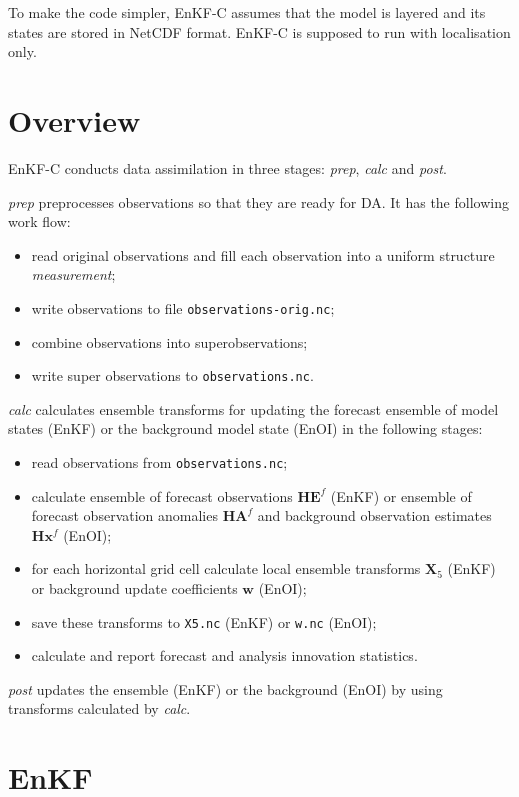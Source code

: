 \documentclass[11pt]{report}
\newcommand{\mb} {\mathbf}
\begin{document}
To make the code simpler, EnKF-C assumes that the model is layered and its states are stored in NetCDF format.
EnKF-C is supposed to run with localisation only.

\chapter{Overview}

EnKF-C conducts data assimilation in three stages: \emph{prep}, \emph{calc} and \emph{post}.

\emph{prep} preprocesses observations so that they are ready for DA.
It has the following work flow:
\begin{itemize}
\item read original observations and fill each observation into a uniform structure \emph{measurement};
\item write observations to file \verb|observations-orig.nc|;
\item combine observations into superobservations;
\item write super observations to \verb|observations.nc|.
\end{itemize}

\emph{calc} calculates ensemble transforms for updating the forecast ensemble of model states (EnKF) or the background model state (EnOI) in the following stages:
\begin{itemize}
\item read observations from \verb|observations.nc|;
\item calculate ensemble of forecast observations $\mb H \mb E^f$ (EnKF) or ensemble of forecast observation anomalies $\mb H \mb A^f$ and background observation estimates $\mb H \mb x^f$ (EnOI);
\item for each horizontal grid cell calculate local ensemble transforms $\mb X_5$ (EnKF) or background update coefficients $\mb w$ (EnOI);
\item save these transforms to \verb|X5.nc| (EnKF) or \verb|w.nc| (EnOI);
\item calculate and report forecast and analysis innovation statistics.
\end{itemize}

\emph{post} updates the ensemble (EnKF) or the background (EnOI) by using transforms calculated by \emph{calc}.

\chapter{EnKF}
\end{document}
